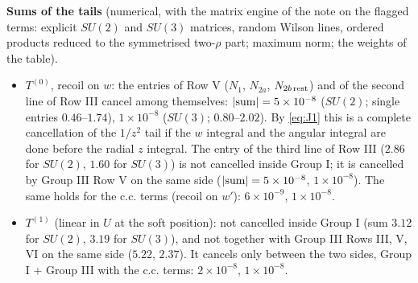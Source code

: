 \documentclass[9pt]{article}
\numberwithin{equation}{section}
\begin{document}
\noindent\textbf{Sums of the tails} (numerical, with the matrix engine of the note on the flagged terms: explicit $SU(2)$ and $SU(3)$ matrices, random Wilson lines, ordered products reduced to the symmetrised two-$\rho$ part; maximum norm; the weights of the table).
\begin{itemize}
\item $T^{(0)}$, recoil on $w$: the entries of Row V ($N_{1}$, $N_{2a}$, $N_{2b\,\rm rest}$) and of the second line of Row III cancel among themselves: $|{\rm sum}|=5\times10^{-8}$ ($SU(2)$; single entries $0.46$--$1.74$), $1\times10^{-8}$ ($SU(3)$; $0.80$--$2.02$). By \eqref{eq:J1} this is a complete cancellation of the $1/z^{2}$ tail if the $w$ integral and the angular integral are done before the radial $z$ integral. The entry of the third line of Row III ($2.86$ for $SU(2)$, $1.60$ for $SU(3)$) is not cancelled inside Group I; it is cancelled by Group III Row V on the same side ($|{\rm sum}|=5\times10^{-8}$, $1\times10^{-8}$). The same holds for the c.c. terms (recoil on $w'$): $6\times10^{-9}$, $1\times10^{-8}$.
\item $T^{(1)}$ (linear in $U$ at the soft position): not cancelled inside Group I (sum $3.12$ for $SU(2)$, $3.19$ for $SU(3)$), and not together with Group III Rows III, V, VI on the same side ($5.22$, $2.37$). It cancels only between the two sides, Group I $+$ Group III with the c.c. terms: $2\times10^{-8}$, $1\times10^{-8}$.
\end{itemize}
\end{document}
